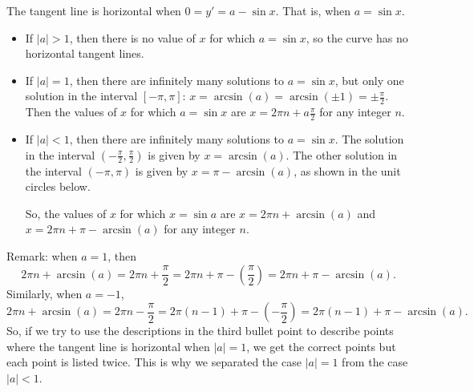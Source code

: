 \begin{solution}
The tangent line is horizontal when $0=y'=a-\sin x$. That is, when $a=\sin x$.
\begin{itemize}
\item
If $|a|>1$, then there is no value of $x$ for which $a=\sin x$, so the curve has no horizontal tangent lines.
\item If $|a| = 1$, then there are infinitely many solutions to $a=\sin x$, but only one solution in the interval $[-\pi,\pi]$: $x=\arcsin(a)=\arcsin(\pm1)=\pm\frac{\pi}{2}$. Then the values of $x$ for which $a=\sin x$ are $x=2\pi n +a \frac{\pi}{2}$ for any integer $n$.
\item If $|a|<1$, then there are infinitely many solutions to $a=\sin x$.
The solution in the interval $\left(-\frac{\pi}{2},\frac{\pi}{2}\right)$ is given by $x=\arcsin(a)$. The other solution in the interval $\left(-\pi,\pi\right)$ is given by $x=\pi-\arcsin(a)$, as shown in the unit circles below.
\begin{center}
\end{center}
So, the values of $x$ for which $x=\sin a$ are $x=2\pi n+\arcsin(a)$ and $x=2\pi n + \pi - \arcsin (a)$ for any integer $n$.
\end{itemize}
Remark: when $a=1$, then
\[2\pi n+\arcsin(a) = 2\pi n + \dfrac{\pi}{2}=2\pi n +\pi -\left(\dfrac {\pi}{2}\right)=2\pi n+\pi-\arcsin(a).\] Similarly, when $a=-1$,
\[2\pi n+\arcsin(a) = 2\pi n - \dfrac{\pi}{2}=2\pi (n-1) +\pi -\left(-\dfrac {\pi}{2}\right)
=2\pi(n-1)+\pi-\arcsin(a).\]
So, if we try to use the descriptions in the third bullet point to describe points where the tangent line is horizontal when $|a|=1$, we get the correct points but each point is listed twice. This is why we separated the case $|a|=1$ from the case $|a|<1$.
\end{solution}




